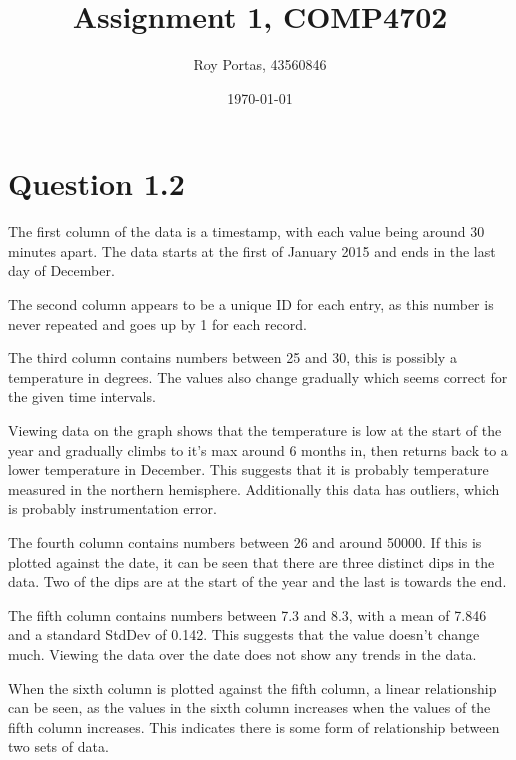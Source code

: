 

\title{Assignment 1, COMP4702}
\author{Roy Portas, 43560846}
\date{\today}



\begin{titlepage}
    \maketitle
\end{titlepage}

\section*{Question 1.2}

The first column of the data is a timestamp, with each value being around 30 minutes apart. The data starts at the first of January 2015 and ends in the last day of December.

The second column appears to be a unique ID for each entry, as this number is never repeated and goes up by 1 for each record.

The third column contains numbers between 25 and 30, this is possibly a
temperature in degrees. The values also change gradually which seems correct for the given time intervals. 

Viewing data on the graph shows that the temperature is low at the start of the year and gradually climbs to it's max around 6 months in, then returns back to a lower temperature in December. This suggests that it is probably temperature measured in the northern hemisphere. Additionally this data has outliers, which is probably instrumentation error.

The fourth column contains numbers between 26 and around 50000. If this is plotted against the date, it can be seen that there are three distinct dips in the data. Two of the dips are at the start of the year and the last is towards the end.

The fifth column contains numbers between 7.3 and 8.3, with a mean of 7.846 and a standard StdDev of 0.142. This suggests that the value doesn't change much. Viewing the data over the date does not show any trends in the data.

When the sixth column is plotted against the fifth column, a linear relationship can be seen, as the values in the sixth column increases when the values of the fifth column increases. This indicates there is some form of relationship between two sets of data.

